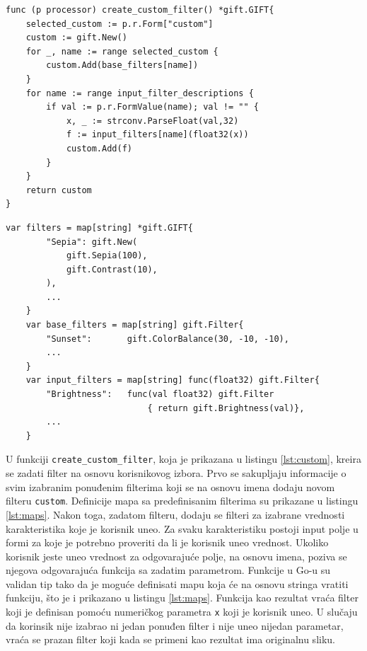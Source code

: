 \documentclass[12pt,oneside]{memoir}
\begin{document}
\begin{center}
\begin{lstlisting}[caption=Funkcija za kreiranje zadatog filtera,label={lst:custom}, backgroundcolor=\color{background},belowskip=-0.8 \baselineskip]
func (p processor) create_custom_filter() *gift.GIFT{
	selected_custom := p.r.Form["custom"]
	custom := gift.New()
	for _, name := range selected_custom {
		custom.Add(base_filters[name])
	}
	for name := range input_filter_descriptions {
		if val := p.r.FormValue(name); val != "" {
			x, _ := strconv.ParseFloat(val,32)
			f := input_filters[name](float32(x))
			custom.Add(f)
		}
	}
	return custom
}
\end{lstlisting}
\end{center}

\begin{center}
\begin{lstlisting}[caption=Mape koje se koriste za definisanje različitih vrsta filtera,label={lst:maps},  backgroundcolor=\color{background}]
	var filters = map[string] *gift.GIFT{
		"Sepia": gift.New(
			gift.Sepia(100),
			gift.Contrast(10),
		),
		...
	}
	var base_filters = map[string] gift.Filter{
		"Sunset":      	gift.ColorBalance(30, -10, -10),
		...
	}
	var input_filters = map[string] func(float32) gift.Filter{
		"Brightness":	func(val float32) gift.Filter 
							{ return gift.Brightness(val)},
		...
	}
\end{lstlisting}
\end{center}

 U funkciji  \texttt{create\_custom\_filter}, koja je prikazana u listingu \ref{lst:custom}, kreira se zadati filter na osnovu korisnikovog izbora. Prvo se sakupljaju informacije o svim izabranim ponuđenim filterima koji se na osnovu imena dodaju novom filteru  \texttt{custom}. Definicije mapa sa predefinisanim filterima su prikazane u listingu \ref{lst:maps}. Nakon toga, zadatom filteru, dodaju se filteri za izabrane vrednosti karakteristika koje je korisnik uneo. Za svaku karakteristiku postoji input polje u formi za koje je potrebno proveriti da li je korisnik uneo vrednost. Ukoliko korisnik jeste uneo vrednost za odgovarajuće polje, na osnovu imena, poziva se njegova odgovarajuća funkcija sa zadatim parametrom. Funkcije u Go-u su validan tip tako da je moguće definisati mapu koja će na osnovu stringa vratiti funkciju, što je i prikazano u listingu \ref{lst:maps}. Funkcija kao rezultat vraća filter koji je definisan pomoću numeričkog parametra  \texttt{x} koji je korisnik uneo. U slučaju da korinsik nije izabrao ni jedan ponuđen filter i nije uneo nijedan parametar, vraća se prazan filter koji kada se primeni kao rezultat ima originalnu sliku.
\end{document}
